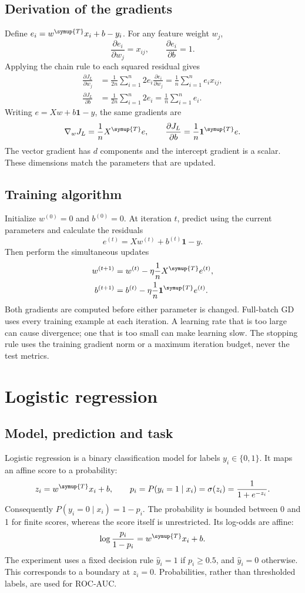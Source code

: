 \subsection{Derivation of the gradients}
Define $e_i=w^{\symup{T}}x_i+b-y_i$. For any feature weight $w_j$,
\[
\frac{\partial e_i}{\partial w_j}=x_{ij},\qquad
\frac{\partial e_i}{\partial b}=1.
\]
Applying the chain rule to each squared residual gives
\[
\begin{aligned}
\frac{\partial J_L}{\partial w_j}
 &=\frac{1}{2n}\sum_{i=1}^{n}2e_i\frac{\partial e_i}{\partial w_j}
 =\frac1n\sum_{i=1}^{n}e_ix_{ij},\\
\frac{\partial J_L}{\partial b}
 &=\frac{1}{2n}\sum_{i=1}^{n}2e_i
 =\frac1n\sum_{i=1}^{n}e_i.
\end{aligned}
\]
Writing $e=Xw+b\mathbf1-y$, the same gradients are
\[
\nabla_wJ_L=\frac1nX^{\symup{T}}e,\qquad
\frac{\partial J_L}{\partial b}=\frac1n\mathbf1^{\symup{T}}e.
\]
The vector gradient has $d$ components and the intercept gradient is a scalar. These dimensions match the parameters that are updated.

\subsection{Training algorithm}
Initialize $w^{(0)}=0$ and $b^{(0)}=0$. At iteration $t$, predict using the current parameters and calculate the residuals
\[
e^{(t)}=Xw^{(t)}+b^{(t)}\mathbf1-y.
\]
Then perform the simultaneous updates
\[
\begin{aligned}
w^{(t+1)}&=w^{(t)}-\eta\frac1nX^{\symup{T}}e^{(t)},\\
b^{(t+1)}&=b^{(t)}-\eta\frac1n\mathbf1^{\symup{T}}e^{(t)}.
\end{aligned}
\]
Both gradients are computed before either parameter is changed. Full-batch GD uses every training example at each iteration. A learning rate that is too large can cause divergence; one that is too small can make learning slow. The stopping rule uses the training gradient norm or a maximum iteration budget, never the test metrics.


\section{Logistic regression}
\subsection{Model, prediction and task}
Logistic regression is a binary classification model for labels $y_i\in\{0,1\}$. It maps an affine score to a probability:
\[
z_i=w^{\symup{T}}x_i+b,\qquad
p_i=P(y_i=1\mid x_i)=\sigma(z_i)=\frac1{1+e^{-z_i}}.
\]
Consequently $P(y_i=0\mid x_i)=1-p_i$. The probability is bounded between 0 and 1 for finite scores, whereas the score itself is unrestricted. Its log-odds are affine:
\[
\log\frac{p_i}{1-p_i}=w^{\symup{T}}x_i+b.
\]
The experiment uses a fixed decision rule $\hat y_i=1$ if $p_i\ge0.5$, and $\hat y_i=0$ otherwise. This corresponds to a boundary at $z_i=0$. Probabilities, rather than thresholded labels, are used for ROC-AUC.

